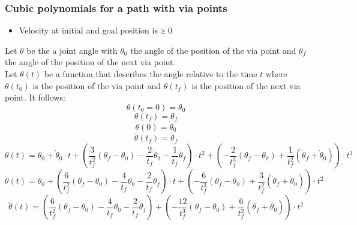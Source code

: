 \documentclass[10pt,a4paper]{article}
\begin{document}
\subsubsection{Cubic polynomials for a path with via points}
\begin{itemize}
	\item Velocity at initial and goal position is ≥ 0
\end{itemize}
Let $\theta$ be the a joint angle with $\theta_0$ the angle of the position of the via point and $\theta_f$ the angle of the position of the next via point. \\
Let $\theta(t)$ be a function that describes the angle relative to the time $t$ where $\theta(t_0)$ is the position of the via point and $\theta(t_f)$ is the position of the next via point. It follows: \\
$$
	\theta(t_0 = 0) = \theta_0
$$
$$
	\theta(t_f) = \theta_f
$$
$$
	\dot{\theta}(0) = \dot{\theta}_0
$$
$$
	\dot{\theta}(t_f) = \dot{\theta}_f
$$
$$
\theta(t) = \theta_0 + \dot{\theta}_0 ⋅ t + \left(\frac{3}{t_f^2}(\theta_f - \theta_0)-\frac{2}{t_f} \dot{\theta}_0 - \frac{1}{t_f}\dot{\theta}_f \right) ⋅ t^2 + \left(-\frac{2}{t_f^3}(\theta_f - \theta_0) + \frac{1}{t_f^2} (\dot{\theta}_f + \dot{\theta}_0) \right) ⋅ t^3
$$
$$
\dot{\theta}(t) = \dot{\theta}_0 + \left(\frac{6}{t_f^2}(\theta_f - \theta_0) - \frac{4}{t_f} \dot{\theta}_0 - \frac{2}{t_f}\dot{\theta}_f \right) ⋅ t + \left(-\frac{6}{t_f^3}(\theta_f - \theta_0) + \frac{3}{t_f^2} (\dot{\theta}_f + \dot{\theta}_0) \right) ⋅ t^2
$$
$$
\ddot{\theta}(t) =\left(\frac{6}{t_f^2}(\theta_f - \theta_0) - \frac{4}{t_f} \dot{\theta}_0 - \frac{2}{t_f}\dot{\theta}_f \right) + \left(-\frac{12}{t_f^3}(\theta_f - \theta_0) + \frac{6}{t_f^2} (\dot{\theta}_f + \dot{\theta}_0) \right) ⋅ t^2
$$
\end{document}
